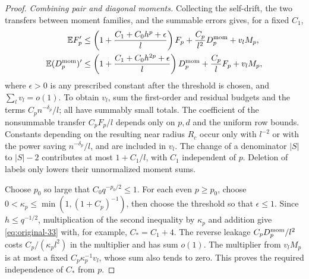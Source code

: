 \begin{proof}
\par\smallskip\noindent\textit{Combining pair and diagonal moments.}\quad
Collecting the self-drift, the two transfers between moment families, and
the summable errors gives, for a fixed \(C_1\),
\[
\begin{split}
 \mathbb E F_p'&\le
   \left(1+\frac{C_1+C_0h^p+\epsilon}{l}\right)F_p
   +\frac{C_p}{l^2}D_p^{\rm mom}+v_lM_p,\\
 \mathbb E(D_p^{\rm mom})'&\le
   \left(1+\frac{C_1+C_0h^{2p}+\epsilon}{l}\right)D_p^{\rm mom}
   +\frac{C_p}{l}F_p+v_lM_p,
\end{split}
\]
where \(\epsilon>0\) is any prescribed constant after the threshold
is chosen, and \(\sum_l v_l=o(1)\). To obtain \(v_l\), sum the
first-order and residual budgets and the terms
\(C_pn^{-\delta_p}/l\); all have summably small totals.
The coefficient of the nonsummable transfer
\(C_pF_p/l\) depends only on \(p,d\) and the uniform row bounds.
Constants depending on the resulting near radius \(R_c\) occur
only with \(l^{-2}\) or with the power saving
\(n^{-\delta_p}/l\), and are included in \(v_l\).
The change of a denominator \(|S|\) to \(|S|-2\) contributes
at most \(1+C_1/l\), with \(C_1\) independent of \(p\).
Deletion of labels only lowers their unnormalized moment sums.

Choose \(p_0\) so large that \(C_0q^{-p_0/2}\le1\).
For each even \(p\ge p_0\), choose
\(0<\kappa_p\le\min(1,(1+C_p)^{-1})\), then choose the
threshold so that \(\epsilon\le1\).
Since \(h\le q^{-1/2}\), multiplication of the second inequality
by \(\kappa_p\) and addition give
\eqref{eq:original-33} with, for example,
\(C_*=C_1+4\). The reverse leakage
\(C_pD_p^{\rm mom}/l^2\) costs
\(C_p/(\kappa_pl^2)\) in the multiplier and has sum \(o(1)\).
The multiplier from \(v_lM_p\) is at most a fixed
\(C_p\kappa_p^{-1}v_l\), whose sum also tends to zero.
This proves the required independence of \(C_*\) from \(p\).
\end{proof}

